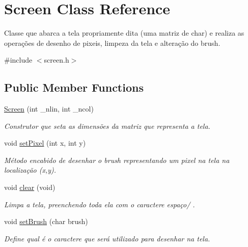 \hypertarget{class_screen}{}\section{Screen Class Reference}
\label{class_screen}


Classe que abarca a tela propriamente dita (uma matriz de char) e realiza as operações de desenho de pixeis, limpeza da tela e alteração do brush.  




{\ttfamily \#include $<$screen.\+h$>$}

\subsection*{Public Member Functions}
\begin{DoxyCompactItemize}
\item 
\mbox{\label{class_screen_a6c21beca43d25854d8674445127ef2eb}} 
\hyperlink{class_screen_a6c21beca43d25854d8674445127ef2eb}{Screen} (int \+\_\+nlin, int \+\_\+ncol)
\begin{DoxyCompactList}\small\item\em Construtor que seta as dimensões da matriz que representa a tela. \end{DoxyCompactList}\item 
\mbox{\label{class_screen_ae6bea81c57a22d226507c3c26fa95ee0}} 
void \hyperlink{class_screen_ae6bea81c57a22d226507c3c26fa95ee0}{set\+Pixel} (int x, int y)
\begin{DoxyCompactList}\small\item\em Método encabido de desenhar o brush representando um pixel na tela na localização (x,y). \end{DoxyCompactList}\item 
\mbox{\label{class_screen_a6941fa7dd557046177b1f73b88c2705f}} 
void \hyperlink{class_screen_a6941fa7dd557046177b1f73b88c2705f}{clear} (void)
\begin{DoxyCompactList}\small\item\em Limpa a tela, preenchendo toda ela com o caractere espaço/\textquotesingle{} \textquotesingle{}. \end{DoxyCompactList}\item 
\mbox{\label{class_screen_a14a00e158f99df199772172554a20576}} 
void \hyperlink{class_screen_a14a00e158f99df199772172554a20576}{set\+Brush} (char brush)
\begin{DoxyCompactList}\small\item\em Define qual é o caractere que será utilizado para desenhar na tela. \end{DoxyCompactList}\end{DoxyCompactItemize}
